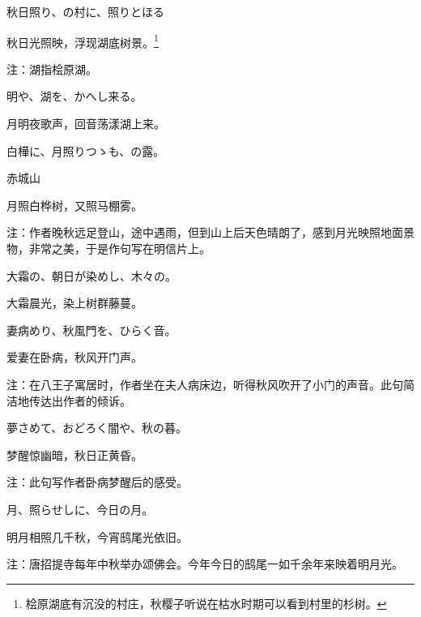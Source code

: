 \begin{haiku}
    {\FH 秋日照り、の村に、照りとほる }

    {\FK 秋日光照映，浮现湖底树景。\footnote{\FT 桧原湖底有沉没的村庄，秋樱子听说在枯水时期可以看到村里的杉树。}}

    {\FT 注：湖指桧原湖。}
\end{haiku}

\begin{haiku}
    {\FH {}明や、湖を、かへし来る。}

    {\FK 月明夜歌声，回音荡漾湖上来。}
\end{haiku}

\begin{haiku}
    {\FH 白樺に、月照りつゝも、の露。}

    {\FK 赤城山}

    {\FK 月照白桦树，又照马棚雾。}

    {\FT 注：作者晚秋远足登山，途中遇雨，但到山上后天色晴朗了，感到月光映照地面景物，非常之美，于是作句写在明信片上。}
\end{haiku}

\begin{haiku}
    {\FH 大霜の、朝日が染めし、木々の。}

    {\FK 大霜晨光，染上树群藤蔓。}
\end{haiku}

\begin{haiku}
    {\FH 妻病めり、秋風門を、ひらく音。}

    {\FK 爱妻在卧病，秋风开门声。}

    {\FT 注：在八王子寓居时，作者坐在夫人病床边，听得秋风吹开了小门的声音。此句简洁地传达出作者的倾诉。}
\end{haiku}

\begin{haiku}
    {\FH 夢さめて、おどろく闇や、秋の暮。}

    {\FK 梦醒惊幽暗，秋日正黄昏。}

    {\FT 注：此句写作者卧病梦醒后的感受。}
\end{haiku}

\begin{haiku}
    {\FH 月、照らせしに、今日の月。}

    {\FK 明月相照几千秋，今宵鸱尾光依旧。}

    {\FT 注：唐招提寺每年中秋举办颂佛会。今年今日的鸱尾一如千余年来映着明月光。}
\end{haiku}

